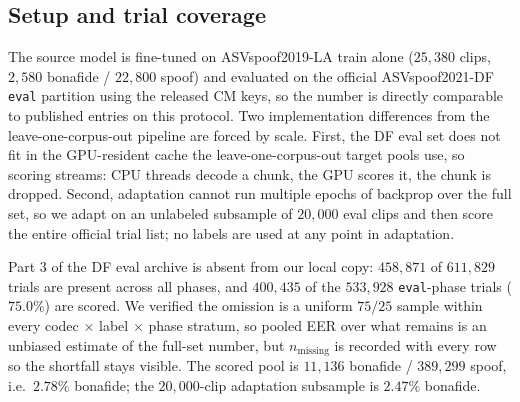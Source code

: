 \documentclass[conference]{IEEEtran}
\begin{document}
\subsection{Setup and trial coverage}
The source model is fine-tuned on ASVspoof2019-LA train alone ($25{,}380$
clips, $2{,}580$ bonafide / $22{,}800$ spoof) and evaluated on the official
ASVspoof2021-DF \texttt{eval} partition using the released CM keys, so the
number is directly comparable to published entries on this protocol. Two
implementation differences from the leave-one-corpus-out pipeline are forced by
scale. First, the DF eval set does not fit in the GPU-resident cache the
leave-one-corpus-out target pools use, so scoring streams: CPU threads decode a
chunk, the GPU scores it, the chunk is dropped. Second, adaptation cannot run
multiple epochs of backprop over the full set, so we adapt on an unlabeled
subsample of $20{,}000$ eval clips and then score the entire official trial
list; no labels are used at any point in adaptation.

Part 3 of the DF eval archive is absent from our local copy: $458{,}871$ of
$611{,}829$ trials are present across all phases, and $400{,}435$ of the
$533{,}928$ \texttt{eval}-phase trials ($75.0\%$) are scored. We verified the
omission is a uniform $75/25$ sample within every codec $\times$ label $\times$
phase stratum, so pooled EER over what remains is an unbiased estimate of the
full-set number, but $n_{\text{missing}}$ is recorded with every row so the
shortfall stays visible. The scored pool is $11{,}136$ bonafide / $389{,}299$
spoof, i.e.\ $2.78\%$ bonafide; the $20{,}000$-clip adaptation subsample is
$2.47\%$ bonafide.
\end{document}
